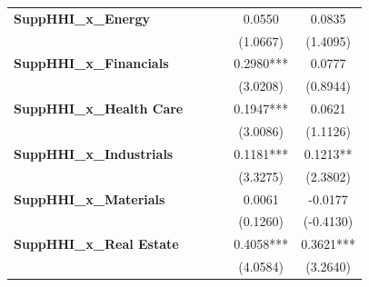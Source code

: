 \begin{center}
\begin{tabular}{lccccc}
\textbf{SuppHHI\_x\_Energy}                   &                       &                        &                        &           0.0550           &           0.0835           \\
\textbf{ }                                    &                       &                        &                        &          (1.0667)          &          (1.4095)          \\
\textbf{SuppHHI\_x\_Financials}               &                       &                        &                        &         0.2980***          &           0.0777           \\
\textbf{ }                                    &                       &                        &                        &          (3.0208)          &          (0.8944)          \\
\textbf{SuppHHI\_x\_Health Care}              &                       &                        &                        &         0.1947***          &           0.0621           \\
\textbf{ }                                    &                       &                        &                        &          (3.0086)          &          (1.1126)          \\
\textbf{SuppHHI\_x\_Industrials}              &                       &                        &                        &         0.1181***          &          0.1213**          \\
\textbf{ }                                    &                       &                        &                        &          (3.3275)          &          (2.3802)          \\
\textbf{SuppHHI\_x\_Materials}                &                       &                        &                        &           0.0061           &          -0.0177           \\
\textbf{ }                                    &                       &                        &                        &          (0.1260)          &         (-0.4130)          \\
\textbf{SuppHHI\_x\_Real Estate}              &                       &                        &                        &         0.4058***          &         0.3621***          \\
\textbf{ }                                    &                       &                        &                        &          (4.0584)          &          (3.2640)          \\

\end{tabular}
\end{center}
